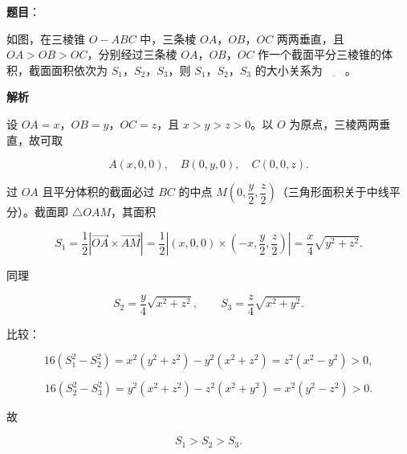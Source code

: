 \begin{answer}

\textbf{题目}：

如图，在三棱锥 $O-ABC$ 中，三条棱 $OA$，$OB$，$OC$ 两两垂直，且 $OA>OB>OC$，分别经过三条棱 $OA$，$OB$，$OC$ 作一个截面平分三棱锥的体积，截面面积依次为 $S_1$，$S_2$，$S_3$，则 $S_1$，$S_2$，$S_3$ 的大小关系为$\underline{\qquad}$。
\nopagebreak[4]
\begin{center}\end{center}
\nopagebreak[4]
\textbf{解析}

设 $OA=x$，$OB=y$，$OC=z$，且 $x>y>z>0$。以 $O$ 为原点，三棱两两垂直，故可取

\nopagebreak[4]
\[A(x,0,0),\quad B(0,y,0),\quad C(0,0,z).\]

过 $OA$ 且平分体积的截面必过 $BC$ 的中点 $M\left(0,\dfrac y2,\dfrac z2\right)$（三角形面积关于中线平分）。截面即 $\triangle OAM$，其面积

\nopagebreak[4]
\[S_1=\frac12\left|\overrightarrow{OA}\times\overrightarrow{AM}\right|
=\frac12\left|(x,0,0)\times\left(-x,\frac y2,\frac z2\right)\right|
=\frac{x}4\sqrt{y^2+z^2}.\]

同理

\nopagebreak[4]
\[S_2=\frac y4\sqrt{x^2+z^2},\qquad S_3=\frac z4\sqrt{x^2+y^2}.\]

比较：

\nopagebreak[4]
\[16\left(S_1^2-S_2^2\right)=x^2(y^2+z^2)-y^2(x^2+z^2)=z^2(x^2-y^2)>0,\]

\nopagebreak[4]
\[16\left(S_2^2-S_3^2\right)=y^2(x^2+z^2)-z^2(x^2+y^2)=x^2(y^2-z^2)>0.\]

故

\nopagebreak[4]
\[S_1>S_2>S_3.\]


\end{answer}
